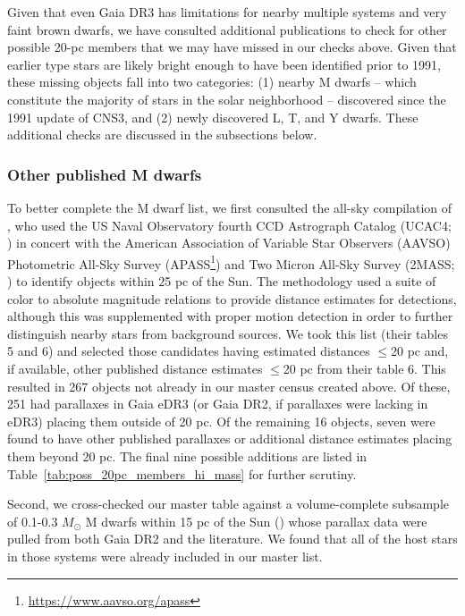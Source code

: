 \documentclass[twocolumn,tighten,twocolappendix]{aastex631}
\begin{document}
Given that even Gaia DR3 has limitations for nearby multiple systems and very faint brown dwarfs, we have consulted additional publications to check for other possible 20-pc members that we may have missed in our checks above. Given that earlier type stars are likely bright enough to have been identified prior to 1991, these missing objects fall into two categories: (1) nearby M dwarfs -- which constitute the majority of stars in the solar neighborhood -- discovered since the 1991 update of CNS3, and (2) newly discovered L, T, and Y dwarfs. These additional checks are discussed in the subsections below.

\subsubsection{Other published M dwarfs\label{sec:missing_M_dwarfs}}

To better complete the M dwarf list, we first consulted the all-sky compilation of \cite{finch2014}, who used the US Naval Observatory fourth CCD Astrograph Catalog (UCAC4; \citealt{zacharias2013}) in concert with the American Association of Variable Star Observers (AAVSO) Photometric All-Sky Survey (APASS\footnote{\url{https://www.aavso.org/apass}}) and Two Micron All-Sky Survey (2MASS; \citealt{skrutskie2006}) to identify objects within 25 pc of the Sun. The methodology used a suite of color to absolute magnitude relations to provide distance estimates for detections, although this was supplemented with proper motion detection in order to further distinguish nearby stars from background sources. We took this list (their tables 5 and 6) and selected those candidates having \cite{finch2014} estimated distances $\le$20 pc and, if available, other published distance estimates $\le$20 pc from their table 6. This resulted in 267 objects not already in our master census created above. Of these, 251 had parallaxes in Gaia eDR3 (or Gaia DR2, if parallaxes were lacking in eDR3) placing them outside of 20 pc. Of the remaining 16 objects, seven were found to have other published parallaxes or additional distance estimates placing them beyond 20 pc. The final nine possible additions are listed in Table~\ref{tab:poss_20pc_members_hi_mass} for further scrutiny.

Second, we cross-checked our master table against a volume-complete subsample of 0.1-0.3 $M_\odot$ M dwarfs within 15 pc of the Sun (\citealt{winters2021}) whose parallax data were pulled from both Gaia DR2 and the literature. We found that all of the host stars in those systems were already included in our master list.
\end{document}
